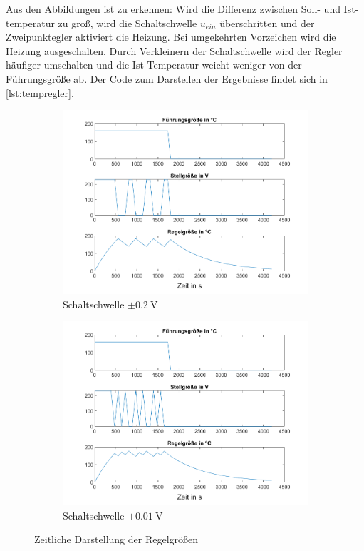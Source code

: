 \documentclass[
    paper=a4,
    fontsize=10pt,
    DIV=13,
    oneside,
]{scrartcl}
\begin{document}
    Aus den Abbildungen ist zu erkennen: Wird die Differenz zwischen Soll- und Ist-temperatur zu groß, wird die Schaltschwelle \(u_{ein}\) überschritten und der Zweipunktegler aktiviert die Heizung. Bei umgekehrten Vorzeichen wird die Heizung ausgeschalten. Durch Verkleinern der Schaltschwelle wird der Regler häufiger umschalten und die Ist-Temperatur weicht weniger von der Führungsgröße ab. Der Code zum Darstellen der Ergebnisse findet sich in \ref{lst:tempregler}.

    \begin{figure}
        \centering
        \begin{subfigure}{0.49\columnwidth}
            \includegraphics[width=1.0\columnwidth]{../versuch1/tempregler_plot.png}
            \caption{Schaltschwelle \(\pm\SI{0.2}{\volt}\)}
            \label{fig:tempregler_plot}   
        \end{subfigure}%
        \hfill%
        \begin{subfigure}{0.49\columnwidth}
            \includegraphics[width=1.0\columnwidth]{../versuch1/tempregler_plot_new.png}
            \caption{Schaltschwelle \(\pm\SI{0.01}{\volt}\)}
            \label{fig:tempregler_plot_new}
        \end{subfigure}
        \caption{Zeitliche Darstellung der Regelgrößen}
    \end{figure}
\end{document}

